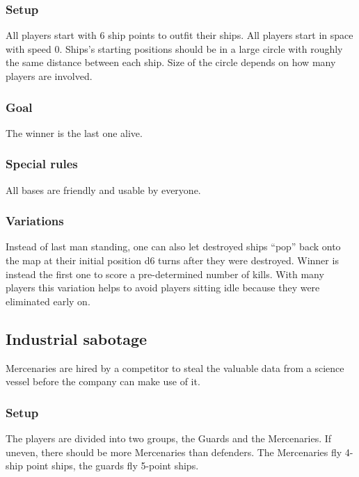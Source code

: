 \documentclass[a4paper,12pt,notitlepage,twocolumn]{article}
\begin{document}
\subsubsection*{Setup}

All players start with 6 ship points to outfit their ships.
All players start in space with speed 0. Ships's
starting positions should be in a large circle with roughly the same distance between
each ship. Size of the circle depends on how many players are
involved. 

\subsubsection*{Goal}

The winner is the last one alive. 

\subsubsection*{Special rules}

All bases are friendly and usable by everyone. 

\subsubsection*{Variations}

Instead of last man standing, one can also let destroyed ships ``pop''
back onto the map at their initial position d6 turns after they were
destroyed. Winner is instead the first one to score a pre-determined number of
kills. With many players this variation helps to avoid players sitting idle 
because they were eliminated early on. 

\subsection{Industrial sabotage}

Mercenaries are hired by a competitor to steal the valuable data from a
science vessel before the company can make use of it.

\subsubsection*{Setup}

The players are divided into two groups, the Guards and the
Mercenaries. If uneven, there should be more Mercenaries than
defenders. The Mercenaries fly 4-ship point ships, the guards fly 5-point ships.
\end{document}

